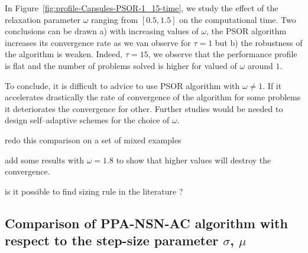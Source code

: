 In Figure~\ref{fig:profile-Capsules-PSOR-1_15-time}, we study the effect of the relaxation parameter $\omega$ ranging from $[0.5,1.5]$ on the computational time.  Two conclusions can be drawn a) with increasing values of $\omega$, the PSOR algorithm increases its convergence rate as we van observe for $\tau=1$ but b) the robustness of the algorithm is weaken. Indeed, $\tau=15$, we observe that the performance profile is flat and the number of problems solved is higher for valued of $\omega$ around $1$.

To conclude, it is difficult to advice to use PSOR algorithm with $\omega\neq 1$. If it accelerates drastically the rate of convergence of the algorithm for some problems it deteriorates the convergence for other. Further studies would be needed to design self--adaptive schemes for the choice of $\omega$.

\begin{ndrva}
  \item redo this comparison on a set of mixed examples 
  \item add some results with $\omega =1.8$ to show that higher values will destroy the convergence.
  \item is it possible to find sizing rule in the literature ?
\end{ndrva}

      
\subsection{Comparison of PPA-NSN-AC algorithm with respect to  the step-size parameter $\sigma$, $\mu$}

